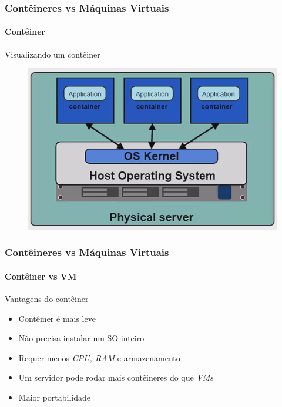 \documentclass[12pt]{beamer}
\begin{document}
\begin{frame}
  \frametitle{Contêineres vs Máquinas Virtuais}
  \framesubtitle{Contêiner}
	\begin{block}{Visualizando um contêiner}
		\begin{figure}[!h]
			\centering
			\includegraphics[width=0.6\paperwidth]{container}
		\end{figure}
	\end{block}
\end{frame}
\begin{frame}
  \frametitle{Contêineres vs Máquinas Virtuais}
  \framesubtitle{Contêiner vs VM}
	\begin{block}{Vantagens do contêiner}
		\begin{itemize}
			\item Contêiner é mais leve
			\pause
			\item Não precisa instalar um SO inteiro
			\pause
			\item Requer menos \emph{CPU, RAM} e armazenamento 
			\pause
			\item Um servidor pode rodar mais contêineres do que \emph{VMs}
			\pause
			\item Maior portabilidade
		\end{itemize}
	\end{block}
\end{frame}
\end{document}
